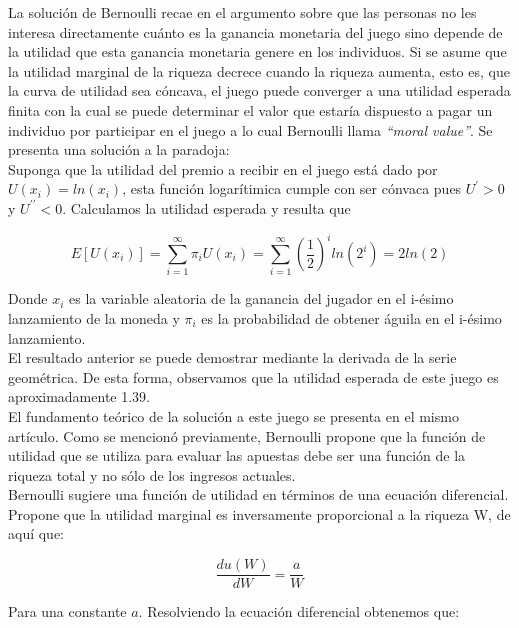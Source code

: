 La solución de Bernoulli recae en el argumento sobre que las personas no les interesa directamente cuánto es la ganancia monetaria del juego sino depende de la utilidad que esta ganancia monetaria genere en los individuos. Si se asume que la utilidad marginal de la riqueza decrece cuando la riqueza aumenta, esto es, que la curva de utilidad sea cóncava, el juego puede converger a una utilidad esperada finita con la cual se puede determinar el valor que estaría dispuesto a pagar un individuo por participar en el juego a lo cual Bernoulli llama \textit{“moral value”}. Se presenta una solución a la paradoja: \\

Suponga que la utilidad del premio a recibir en el juego está dado por $U(x_i) = ln(x_i)$, esta función logarítimica cumple con ser cónvaca pues $U^\prime > 0$ y $U^{\prime \prime} < 0$. Calculamos la utilidad esperada y resulta que

\begin{equation}
    E[U(x_i)] = \sum_{i = 1} ^{\infty} \pi_i U(x_i) = \sum_{i = 1} ^{\infty} (\frac{1}{2})^i ln(2^i)= 2 ln(2)
\end{equation} 

Donde $x_i$ es la variable aleatoria de la ganancia del jugador en el i-ésimo lanzamiento de la moneda y $\pi_i$ es la probabilidad de obtener águila en el i-ésimo lanzamiento. \\

El resultado anterior se puede demostrar mediante la derivada de la serie geométrica. De esta forma, observamos que la utilidad esperada de este juego es aproximadamente 1.39. \\

El fundamento teórico de la solución a este juego se presenta en el mismo artículo. Como se mencionó previamente, Bernoulli propone que la función de utilidad que se utiliza para evaluar las apuestas debe ser una función de la riqueza total y no sólo de los ingresos actuales. \\

Bernoulli sugiere una función de utilidad en términos de una ecuación diferencial. Propone que la utilidad marginal es inversamente proporcional a la riqueza W, de aquí que:

\begin{equation}
    \frac{du(W)}{dW} = \frac{a}{W}
\end{equation}

Para una constante $a$. Resolviendo la ecuación diferencial obtenemos que: 


